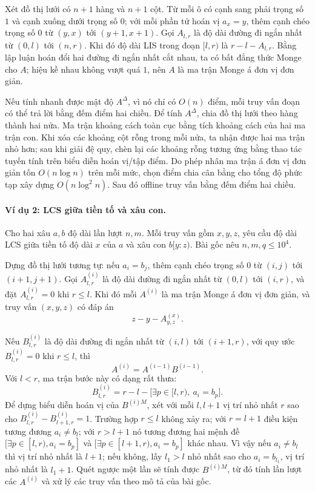 \documentclass[11pt]{article}
\begin{document}
Xét đồ thị lưới có $n+1$ hàng và $n+1$ cột. Từ mỗi ô có cạnh sang phải trọng số
$1$ và cạnh xuống dưới trọng số $0$; với mỗi phần tử hoán vị $a_x=y$, thêm cạnh
chéo trọng số $0$ từ $(y,x)$ tới $(y+1,x+1)$. Gọi $A_{l,r}$ là độ dài đường đi
ngắn nhất từ $(0,l)$ tới $(n,r)$. Khi đó độ dài LIS trong đoạn $[l,r)$ là
$r-l-A_{l,r}$. Bằng lập luận hoán đổi hai đường đi ngắn nhất cắt nhau, ta có
bất đẳng thức Monge cho $A$; hiệu kề nhau không vượt quá $1$, nên $A$ là ma
trận Monge á đơn vị đơn giản.

Nếu tính nhanh được mật độ $A^{\Delta}$, vì nó chỉ có $O(n)$ điểm, mỗi truy vấn
đoạn có thể trả lời bằng đếm điểm hai chiều. Để tính $A^{\Delta}$, chia đồ thị lưới
theo hàng thành hai nửa. Ma trận khoảng cách toàn cục bằng tích khoảng cách của
hai ma trận con. Khi xóa các khoảng cột rỗng trong mỗi nửa, ta nhận được hai
ma trận nhỏ hơn; sau khi giải đệ quy, chèn lại các khoảng rỗng tương ứng bằng
thao tác tuyến tính trên biểu diễn hoán vị/tập điểm. Do phép nhân ma trận á
đơn vị đơn giản tốn $O(n\log n)$ trên mỗi mức, chọn điểm chia cân bằng cho tổng
độ phức tạp xây dựng $O(n\log^2 n)$. Sau đó offline truy vấn bằng đếm điểm hai
chiều.

\paragraph{Ví dụ 2: LCS giữa tiền tố và xâu con.}
Cho hai xâu $a,b$ độ dài lần lượt $n,m$. Mỗi truy vấn gồm $x,y,z$, yêu cầu độ
dài LCS giữa tiền tố độ dài $x$ của $a$ và xâu con $b[y:z)$. Bài gốc nêu
$n,m,q\le 10^4$.

Dựng đồ thị lưới tương tự: nếu $a_i=b_j$, thêm cạnh chéo trọng số $0$ từ
$(i,j)$ tới $(i+1,j+1)$. Gọi \(A^{(i)}_{l,r}\) là độ dài đường đi ngắn nhất từ
\((0,l)\) tới \((i,r)\), và đặt \(A^{(i)}_{l,r}=0\) khi \(r\le l\). Khi đó mỗi
\(A^{(i)}\) là ma trận Monge á đơn vị đơn giản, và truy vấn \((x,y,z)\) có đáp
án
\[
  z-y-A^{(x)}_{y,z}.
\]

Nếu \(B^{(i)}_{l,r}\) là độ dài đường đi ngắn nhất từ \((i,l)\) tới
\((i+1,r)\), với quy ước \(B^{(i)}_{l,r}=0\) khi \(r\le l\), thì
\[
  A^{(i)}=A^{(i-1)}B^{(i-1)}.
\]
Với \(l<r\), ma trận bước này có dạng rất thưa:
\[
  B^{(i)}_{l,r}=r-l-\bigl[\exists p\in[l,r),\ a_i=b_p\bigr].
\]
Để dựng biểu diễn hoán vị của \(B^{(i)M}\), xét với mỗi \(l,l+1\) vị trí nhỏ
nhất \(r\) sao cho \(B^{(i)}_{l,r}-B^{(i)}_{l+1,r}=1\). Trường hợp \(r\le l\)
không xảy ra; với \(r=l+1\) điều kiện tương đương \(a_i\ne b_l\); với
\(r>l+1\) nó tương đương hai mệnh đề
\([\exists p\in[l,r),a_i=b_p]\) và \([\exists p\in[l+1,r),a_i=b_p]\) khác nhau.
Vì vậy nếu \(a_i\ne b_l\) thì vị trí nhỏ nhất là \(l+1\); nếu không, lấy
\(l_1>l\) nhỏ nhất sao cho \(a_i=b_{l_1}\), vị trí nhỏ nhất là \(l_1+1\).
Quét ngược một lần sẽ tính được \(B^{(i)M}\), từ đó tính lần lượt các
\(A^{(i)}\) và xử lý các truy vấn theo mô tả của bài gốc.
\end{document}
